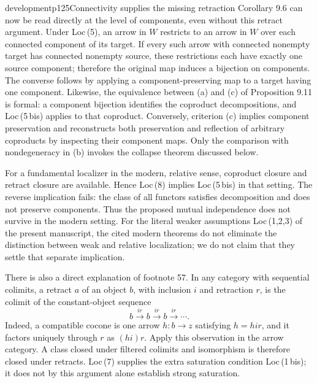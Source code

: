 \begin{dcomment}{development}{p125}{Connectivity supplies the missing retraction}
Corollary 9.6 can now be read directly at the level of components, even without this retract argument. Under Loc\,(5), an arrow in $W$ restricts to an arrow in $W$ over each connected component of its target. If every such arrow with connected nonempty target has connected nonempty source, these restrictions each have exactly one source component; therefore the original map induces a bijection on components. The converse follows by applying a component-preserving map to a target having one component. Likewise, the equivalence between (a) and (c) of Proposition 9.11 is formal: a component bijection identifies the coproduct decompositions, and Loc\,(5\,bis) applies to that coproduct. Conversely, criterion (c) implies component preservation and reconstructs both preservation and reflection of arbitrary coproducts by inspecting their component maps. Only the comparison with nondegeneracy in (b) invokes the collapse theorem discussed below.

For a fundamental localizer in the modern, relative sense, coproduct closure and retract closure are available. Hence Loc\,(8) implies Loc\,(5\,bis) in that setting. The reverse implication fails: the class of all functors satisfies decomposition and does not preserve components. Thus the proposed mutual independence does not survive in the modern setting. For the literal weaker assumptions Loc\,(1,2,3) of the present manuscript, the cited modern theorems do not eliminate the distinction between weak and relative localization; we do not claim that they settle that separate implication.

There is also a direct explanation of footnote 57. In any category with sequential colimits, a retract $a$ of an object $b$, with inclusion $i$ and retraction $r$, is the colimit of the constant-object sequence
\[
 b\xrightarrow{ir}b\xrightarrow{ir}b\xrightarrow{ir}\cdots.
\]
Indeed, a compatible cocone is one arrow $h:b\longrightarrow z$ satisfying $h=hir$, and it factors uniquely through $r$ as $(hi)r$. Apply this observation in the arrow category. A class closed under filtered colimits and isomorphism is therefore closed under retracts. Loc\,(7) supplies the extra saturation condition Loc\,(1\,bis); it does not by this argument alone establish strong saturation.
\end{dcomment}

